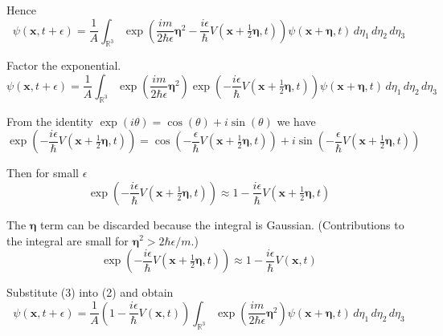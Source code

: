 Hence
\begin{equation*}
\psi(\mathbf{x},t+\epsilon)=
\frac{1}{A}\int_{\mathbb R^3}
\exp\left(
\frac{im}{2\hbar\epsilon}\boldsymbol\eta^2
-\frac{i\epsilon}{\hbar} V\left(\mathbf x+\tfrac{1}{2}\boldsymbol\eta,t\right)
\right)
\psi(\mathbf{x}+\boldsymbol\eta,t)\,d\eta_1\,d\eta_2\,d\eta_3
\end{equation*}

Factor the exponential.
\begin{equation*}
\psi(\mathbf{x},t+\epsilon)=
\frac{1}{A}\int_{\mathbb R^3}
\exp\left(\frac{im}{2\hbar\epsilon}\boldsymbol\eta^2\right)
\exp\left(-\frac{i\epsilon}{\hbar}V\left(\mathbf x+\tfrac{1}{2}\boldsymbol\eta,t\right)\right)
\psi(\mathbf{x}+\boldsymbol\eta,t)\,d\eta_1\,d\eta_2\,d\eta_3
\tag{2}
\end{equation*}

From the identity $\exp(i\theta)=\cos(\theta)+i\sin(\theta)$ we have
\begin{equation*}
\exp\left(-\frac{i\epsilon}{\hbar}V\left(\mathbf x+\tfrac{1}{2}\boldsymbol\eta,t\right)\right)=
\cos\left(-\frac{\epsilon}{\hbar}V\left(\mathbf x+\tfrac{1}{2}\boldsymbol\eta,t\right)\right)
+i\sin\left(-\frac{\epsilon}{\hbar}V\left(\mathbf x+\tfrac{1}{2}\boldsymbol\eta,t\right)\right)
\end{equation*}

Then for small $\epsilon$
\begin{equation*}
\exp\left(-\frac{i\epsilon}{\hbar}V\left(\mathbf x+\tfrac{1}{2}\boldsymbol\eta,t\right)\right)\approx
1-\frac{i\epsilon}{\hbar}V\left(\mathbf x+\tfrac{1}{2}\boldsymbol\eta,t\right)
\end{equation*}

The $\boldsymbol\eta$ term can be discarded because the integral is Gaussian.
(Contributions to the integral are small for $\boldsymbol\eta^2>2\hbar\epsilon/m$.)
\begin{equation*}
\exp\left(-\frac{i\epsilon}{\hbar}V\left(\mathbf x+\tfrac{1}{2}\boldsymbol\eta,t\right)\right)\approx
1-\frac{i\epsilon}{\hbar}V\left(\mathbf x,t\right)
\tag{3}
\end{equation*}

Substitute (3) into (2) and obtain
\begin{equation*}
\psi(\mathbf{x},t+\epsilon)=
\frac{1}{A}
\left(1-\frac{i\epsilon}{\hbar}V\left(\mathbf x,t\right)\right)
\int_{\mathbb R^3}
\exp\left(\frac{im}{2\hbar\epsilon}\boldsymbol\eta^2\right)
\psi(\mathbf x+\boldsymbol\eta,t)\,d\eta_1\,d\eta_2\,d\eta_3
\tag{4}
\end{equation*}

